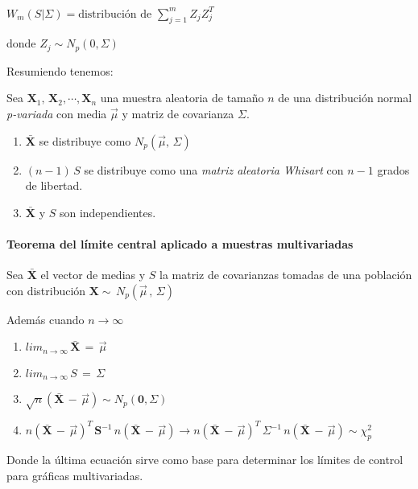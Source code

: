 \documentclass[english]{report}
\begin{document}
\vspace{5pt}
$W_m(S|\Sigma)= \text{distribución de   } \sum_{j=1}^m Z_jZ_j^T$

donde $Z_j \sim N_p(0,\Sigma)$ 

\vspace{5pt}

Resumiendo tenemos:

Sea $\textbf{X}_1,\,\textbf{X}_2,\cdots,\textbf{X}_n$ una muestra aleatoria de tamaño $n$ de una distribución normal \emph{p-variada} con media $\vec{\mu}$ y matriz de covarianza $\Sigma$.

\begin{enumerate}
\item $\bar{\textbf{X}}$ se distribuye como $N_p(\vec{\mu},\,\Sigma)$
\item $(n-1)\,S$ se distribuye como una \emph{matriz aleatoria Whisart} con $n-1$ grados de libertad.
\item $\bar{\textbf{X}}$ y $S$ son independientes.
\end{enumerate}

\vspace{5pt}

\paragraph{Teorema del límite central aplicado a muestras multivariadas}
Sea $\bar{\textbf{X}}$ el vector de medias y $S$ la matriz de covarianzas tomadas de una población con distribución $\textbf{X}\sim\,N_p(\vec{\mu}\,,\,\Sigma)$

Además cuando $n \rightarrow \infty$

\begin{enumerate}
\item $lim_{n\rightarrow\infty}\,\bar{\textbf{X}}\,=\,\vec{\mu}$
\item $lim_{n\rightarrow\infty}\,S\,=\,\Sigma$
\item $\sqrt{n}(\bar{\textbf{X}}\,-\,\vec{\mu}) \sim N_p(\textbf{0},\Sigma)$
\item $n(\bar{\textbf{X}}\,-\,\vec{\mu})^T\,\textbf{S}^{-1}\,n(\bar{\textbf{X}}\,-\,\vec{\mu}) \rightarrow n(\bar{\textbf{X}}\,-\,\vec{\mu})^T\,\Sigma^{-1}\,n(\bar{\textbf{X}}\,-\,\vec{\mu})\sim \chi_p^2$

\end{enumerate}

\vspace{5pt}

Donde la última ecuación sirve como base para determinar los límites de control para gráficas multivariadas.
\end{document}
